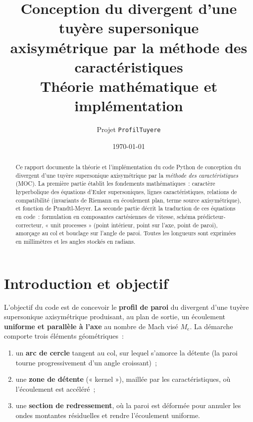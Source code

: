 \documentclass[11pt,a4paper]{article}
\title{\textbf{Conception du divergent d'une tuyère supersonique\\
axisymétrique par la méthode des caractéristiques}\\[4pt]
\large Théorie mathématique et implémentation}
\author{Projet \texttt{ProfilTuyere}}
\date{\today}
\begin{document}
\maketitle

\begin{abstract}
\noindent
Ce rapport documente la théorie et l'implémentation du code Python de
conception du divergent d'une tuyère supersonique axisymétrique par la
\emph{méthode des caractéristiques} (MOC). La première partie établit les
fondements mathématiques~: caractère hyperbolique des équations d'Euler
supersoniques, lignes caractéristiques, relations de compatibilité (invariants
de Riemann en écoulement plan, terme source axisymétrique), et fonction de
Prandtl-Meyer. La seconde partie décrit la traduction de ces équations en code~:
formulation en composantes cartésiennes de vitesse, schéma prédicteur-correcteur,
« unit processes » (point intérieur, point sur l'axe, point de paroi), amorçage
au col et bouclage sur l'angle de paroi. Toutes les longueurs sont exprimées en
millimètres et les angles stockés en radians.
\end{abstract}

\tableofcontents
\bigskip

\section{Introduction et objectif}

L'objectif du code est de concevoir le \textbf{profil de paroi} du divergent
d'une tuyère supersonique axisymétrique produisant, au plan de sortie, un
écoulement \textbf{uniforme et parallèle à l'axe} au nombre de Mach visé $M_e$.
La démarche comporte trois éléments géométriques~:
\begin{enumerate}[nosep]
  \item un \textbf{arc de cercle} tangent au col, sur lequel s'amorce la
        détente (la paroi tourne progressivement d'un angle croissant)~;
  \item une \textbf{zone de détente} (« kernel »), maillée par les
        caractéristiques, où l'écoulement est accéléré~;
  \item une \textbf{section de redressement}, où la paroi est déformée pour
        annuler les ondes montantes résiduelles et rendre l'écoulement uniforme.
\end{enumerate}
\end{document}
